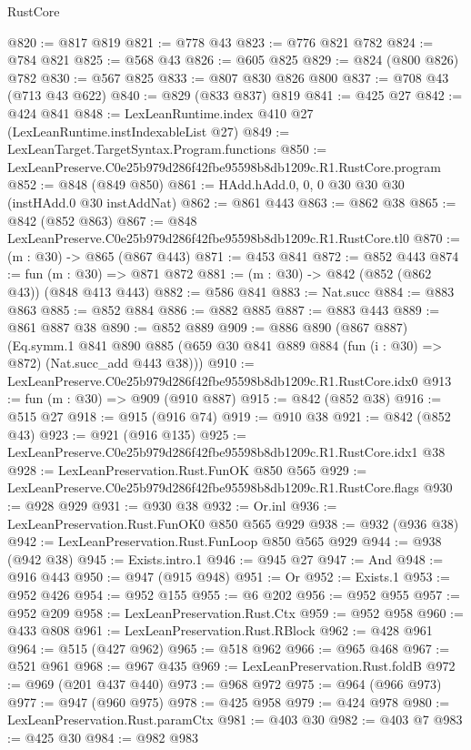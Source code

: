 \begin{lexlean}{RustCore}
\begin{coremodule}
@820 := @817 @819
@821 := @778 @43
@823 := @776 @821 @782
@824 := @784 @821
@825 := @568 @43
@826 := @605 @825
@829 := @824 (@800 @826) @782
@830 := @567 @825
@833 := @807 @830 @826 @800
@837 := @708 @43 (@713 @43 @622)
@840 := @829 (@833 @837) @819
@841 := @425 @27
@842 := @424 @841
@848 := LexLeanRuntime.index @410 @27 (LexLeanRuntime.instIndexableList @27)
@849 := LexLeanTarget.TargetSyntax.Program.functions
@850 := LexLeanPreserve.C0e25b979d286f42fbe95598b8db1209c.R1.RustCore.program
@852 := @848 (@849 @850)
@861 := HAdd.hAdd.{0, 0, 0} @30 @30 @30 (instHAdd.{0} @30 instAddNat)
@862 := @861 @443
@863 := @862 @38
@865 := @842 (@852 @863)
@867 := @848 LexLeanPreserve.C0e25b979d286f42fbe95598b8db1209c.R1.RustCore.tl0
@870 := (m : @30) -> @865 (@867 @443)
@871 := @453 @841
@872 := @852 @443
@874 := fun (m : @30) => @871 @872
@881 := (m : @30) -> @842 (@852 (@862 @43)) (@848 @413 @443)
@882 := @586 @841
@883 := Nat.succ
@884 := @883 @863
@885 := @852 @884
@886 := @882 @885
@887 := @883 @443
@889 := @861 @887 @38
@890 := @852 @889
@909 := @886
    @890
    (@867 @887)
    (Eq.symm.{1}
      @841
      @890
      @885
      (@659 @30 @841 @889 @884 (fun (i : @30) => @872) (Nat.succ_add @443 @38)))
@910 := LexLeanPreserve.C0e25b979d286f42fbe95598b8db1209c.R1.RustCore.idx0
@913 := fun (m : @30) => @909 (@910 @887)
@915 := @842 (@852 @38)
@916 := @515 @27
@918 := @915 (@916 @74)
@919 := @910 @38
@921 := @842 (@852 @43)
@923 := @921 (@916 @135)
@925 := LexLeanPreserve.C0e25b979d286f42fbe95598b8db1209c.R1.RustCore.idx1 @38
@928 := LexLeanPreservation.Rust.FunOK @850 @565
@929 := LexLeanPreserve.C0e25b979d286f42fbe95598b8db1209c.R1.RustCore.flags
@930 := @928 @929
@931 := @930 @38
@932 := Or.inl
@936 := LexLeanPreservation.Rust.FunOK0 @850 @565 @929
@938 := @932 (@936 @38)
@942 := LexLeanPreservation.Rust.FunLoop @850 @565 @929
@944 := @938 (@942 @38)
@945 := Exists.intro.{1}
@946 := @945 @27
@947 := And
@948 := @916 @443
@950 := @947 (@915 @948)
@951 := Or
@952 := Exists.{1}
@953 := @952 @426
@954 := @952 @155
@955 := @6 @202
@956 := @952 @955
@957 := @952 @209
@958 := LexLeanPreservation.Rust.Ctx
@959 := @952 @958
@960 := @433 @808
@961 := LexLeanPreservation.Rust.RBlock
@962 := @428 @961
@964 := @515 (@427 @962)
@965 := @518 @962
@966 := @965 @468
@967 := @521 @961
@968 := @967 @435
@969 := LexLeanPreservation.Rust.foldB
@972 := @969 (@201 @437 @440)
@973 := @968 @972
@975 := @964 (@966 @973)
@977 := @947 (@960 @975)
@978 := @425 @958
@979 := @424 @978
@980 := LexLeanPreservation.Rust.paramCtx
@981 := @403 @30
@982 := @403 @7
@983 := @425 @30
@984 := @982 @983

\end{coremodule}
\end{lexlean}

